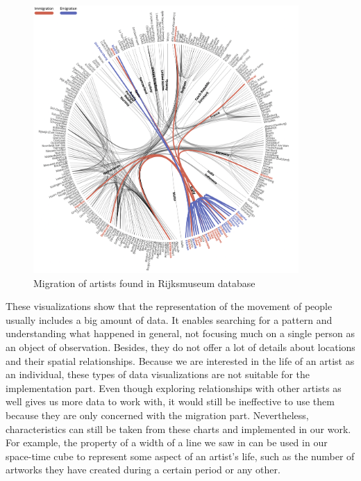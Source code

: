 \begin{figure}[h]
    \begin{center}
        \includegraphics[width=0.9\textwidth]{graphics/2-literature-review/16}
    \end{center}
    \caption{Migration of artists found in Rijksmuseum database}
    \label{fig:figure2.16}
\end{figure}

These visualizations show that the representation of the movement of people usually includes a big amount of data. It enables
searching for a pattern and understanding what happened in general, not focusing much on a single person as an object of observation. Besides, they
do not offer a lot of details about locations and their spatial relationships. Because we are interested in the life of an artist as an individual,
these types of data visualizations are not suitable for the implementation part. Even though exploring relationships with other artists as well
gives us more data to work with, it would still be ineffective to use them because they are only concerned with the migration part. Nevertheless,
characteristics can still be taken from these charts and implemented in our work. For example, the property of a width of a line we saw in
 can be used in our space-time cube to represent some aspect of an artist's life, such as the number of artworks they have
created during a certain period or any other.
